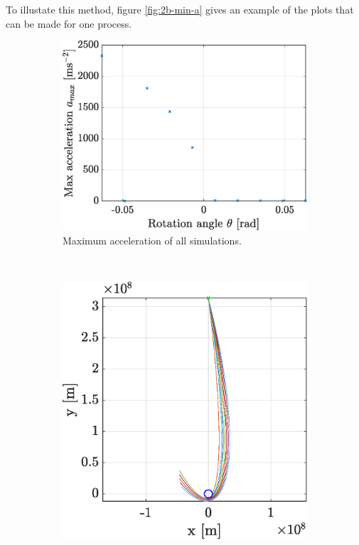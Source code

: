 \documentclass[a4paper,12pt,twoside]{article}
\begin{document}
To illustate this method, figure \ref{fig:2b-min-a} gives an example of the plots that can be made for one process.

\begin{figure}[h]
  \centering
  \begin{subfigure}[t]{0.45\textwidth}
    \includegraphics[width=\textwidth]{graphs/ex2b_convacc.eps}
    \caption{Maximum acceleration of all simulations.}
    \label{fig:2b-min-a-traj}
  \end{subfigure}
  ~
  \begin{subfigure}[t]{0.45\textwidth}
    \includegraphics[width=\textwidth]{graphs/ex2b_traj.eps}

\end{subfigure}
\end{figure}
\end{document}
